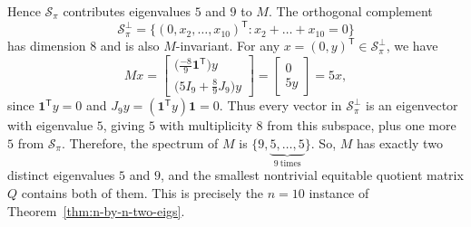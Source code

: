 \documentclass[12pt,twoside]{article}
\begin{document}
	Hence $\mathcal{S}_\pi$ contributes eigenvalues $5$ and $9$ to $M$. The orthogonal complement
	$$
	\mathcal{S}_\pi^\perp
	=
	\{(0,x_2,\dots,x_{10})^\mathsf{T} : x_2+\dots+x_{10}=0\}
	$$
	has dimension $8$ and is also $M$-invariant. For any $x=(0,y)^\mathsf{T}\in\mathcal{S}_\pi^\perp$, we have
	$$
	Mx
	=
	\begin{bmatrix}
		\bigl(\tfrac{-8}{9}\mathbf{1}^\mathsf{T}\bigr)y\\
		\bigl(5I_9 + \tfrac{8}{9}J_9\bigr)y
	\end{bmatrix}
	=
	\begin{bmatrix}
		0\\
		5y
	\end{bmatrix}
	=5x,
	$$
	since $\mathbf{1}^\mathsf{T}y=0$ and $J_9y=(\mathbf{1}^\mathsf{T}y)\mathbf{1}=0$. Thus every vector in $\mathcal{S}_\pi^\perp$ is an eigenvector with eigenvalue $5$, giving $5$ with multiplicity $8$ from this subspace, plus one more $5$ from $\mathcal{S}_\pi$. Therefore, the spectrum of $M$  is $\{9,\underbrace{5,\dots,5}_{9\ \text{times}}\}.$ So, $M$ has exactly two distinct eigenvalues $5$ and $9$, and the smallest nontrivial equitable quotient matrix $Q$ contains both of them. This is precisely the $n=10$ instance of Theorem~\ref{thm:n-by-n-two-eigs}.
\end{document}
